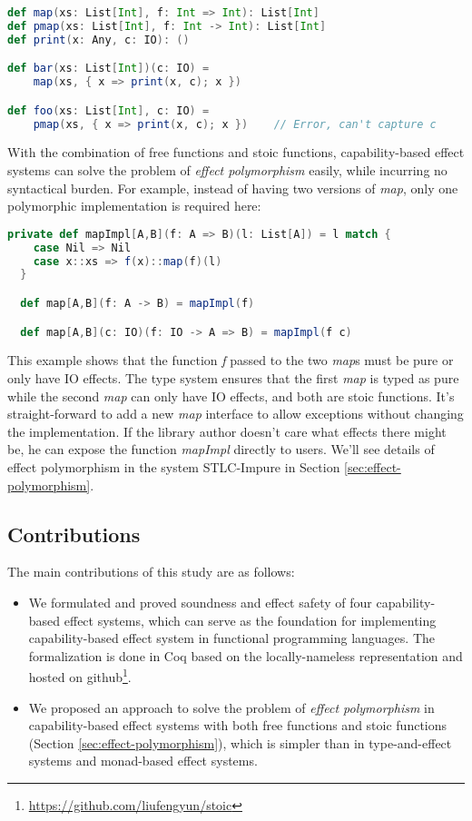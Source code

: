 \begin{lstlisting}[language=Scala]
def map(xs: List[Int], f: Int => Int): List[Int]
def pmap(xs: List[Int], f: Int -> Int): List[Int]
def print(x: Any, c: IO): ()

def bar(xs: List[Int])(c: IO) =
    map(xs, { x => print(x, c); x })

def foo(xs: List[Int], c: IO) =
    pmap(xs, { x => print(x, c); x })    // Error, can't capture c
\end{lstlisting}

With the combination of free functions and stoic functions,
capability-based effect systems can solve the problem of \emph{effect
  polymorphism} easily, while incurring no syntactical burden. For
example, instead of having two versions of \emph{map}, only one
polymorphic implementation is required here:

\begin{lstlisting}[language=Scala]
  private def mapImpl[A,B](f: A => B)(l: List[A]) = l match {
    case Nil => Nil
    case x::xs => f(x)::map(f)(l)
  }

  def map[A,B](f: A -> B) = mapImpl(f)

  def map[A,B](c: IO)(f: IO -> A => B) = mapImpl(f c)
\end{lstlisting}

This example shows that the function \emph{f} passed to the two
\emph{map}s must be pure or only have IO effects. The type system
ensures that the first \emph{map} is typed as pure while the second
\emph{map} can only have IO effects, and both are stoic
functions. It's straight-forward to add a new \emph{map} interface to
allow exceptions without changing the implementation. If the library
author doesn't care what effects there might be, he can expose the
function \emph{mapImpl} directly to users.  We'll see details of
effect polymorphism in the system STLC-Impure in Section
\ref{sec:effect-polymorphism}.

\subsection{Contributions}

The main contributions of this study are as follows:

\begin{itemize}
\item We formulated and proved soundness and effect safety of four
  capability-based effect systems, which can serve as the foundation
  for implementing capability-based effect system in functional
  programming languages. The formalization is done in Coq based on the
  locally-nameless representation\cite{chargueraud-11-ln} and hosted
  on github\footnote{\url{https://github.com/liufengyun/stoic}}.
\item We proposed an approach to solve the problem of \emph{effect
    polymorphism} in capability-based effect systems with both free
  functions and stoic functions (Section
  \ref{sec:effect-polymorphism}), which is simpler than in
  type-and-effect systems and monad-based effect systems.
\end{itemize}


